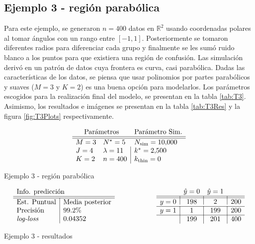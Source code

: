 \documentclass[../Main/Main.tex]{subfiles}
\begin{document}
\subsection*{Ejemplo 3 - región parabólica}
Para este ejemplo, se generaron $n = 400$ datos en $\mathbb{R}^2$ usando coordenadas polares al tomar ángulos con un rango entre $[-1,1]$. Posteriormente se tomaron diferentes radios para diferenciar cada grupo y finalmente se les sumó ruido blanco a los puntos para que existiera una región de confusión. Las simulación derivó en un patrón de datos cuya frontera es curva, casi parabólica. Dadas las características de los datos, se piensa que usar polinomios por partes parabólicos y suaves ($M = 3$ y $K = 2$) es una buena opción para modelarlos. Los parámetros escogidos para la realización final del modelo, se presentan en la tabla \ref{tab:T3}. Asimismo, los resultados e imágenes se presentan en la tabla \ref{tab:T3Res} y la figura \ref{fig:T3Plots} respectivamente.

\begin{table}[h]
$$\paramsmod{3}{4}{2}{5}{11}{400}{\num{10000}}{\num{2500}}{0}$$
\caption{Ejemplo 3 - región parabólica}
\label{tab:T3}
\end{table}

\begin{table}[h]
\begin{align*}
\resultados{\text{Media posterior}}{99.2}{0.04352}
\qquad\qquad\qquad
\matconf{198}{2}{200}{1}{199}{200}{199}{201}{400}
\end{align*}
\caption{Ejemplo 3 - resultados}
\label{tab:T3Res}
\end{table}
\end{document}

